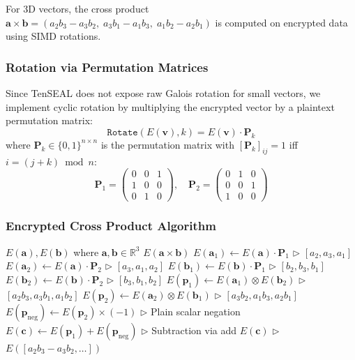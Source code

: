 \documentclass[conference,12pt]{IEEEtran}
\begin{document}
For 3D vectors, the cross product $\mathbf{a} \times \mathbf{b} = (a_2 b_3 - a_3 b_2, \; a_3 b_1 - a_1 b_3, \; a_1 b_2 - a_2 b_1)$ is computed on encrypted data using SIMD rotations.

\subsubsection{Rotation via Permutation Matrices}
Since TenSEAL does not expose raw Galois rotation for small vectors, we implement cyclic rotation by multiplying the encrypted vector by a plaintext permutation matrix:
\begin{equation}
    \texttt{Rotate}(E(\mathbf{v}), k) = E(\mathbf{v}) \cdot \mathbf{P}_k
\end{equation}
where $\mathbf{P}_k \in \{0,1\}^{n \times n}$ is the permutation matrix with $[\mathbf{P}_k]_{ij} = 1$ iff $i = (j+k) \bmod n$:
\begin{equation}
    \mathbf{P}_1 = \begin{pmatrix} 0 & 0 & 1 \\ 1 & 0 & 0 \\ 0 & 1 & 0 \end{pmatrix}, \quad
    \mathbf{P}_2 = \begin{pmatrix} 0 & 1 & 0 \\ 0 & 0 & 1 \\ 1 & 0 & 0 \end{pmatrix}
\end{equation}

\subsubsection{Encrypted Cross Product Algorithm}

\begin{algorithm}[htbp]
\caption{Encrypted Cross Product}
\label{alg:cross_product}
\begin{algorithmic}[1]
\REQUIRE $E(\mathbf{a}), E(\mathbf{b})$ where $\mathbf{a}, \mathbf{b} \in \mathbb{R}^3$
\ENSURE $E(\mathbf{a} \times \mathbf{b})$
\STATE $E(\mathbf{a}_1) \leftarrow E(\mathbf{a}) \cdot \mathbf{P}_1$ \hfill $\triangleright$ $[a_2, a_3, a_1]$
\STATE $E(\mathbf{a}_2) \leftarrow E(\mathbf{a}) \cdot \mathbf{P}_2$ \hfill $\triangleright$ $[a_3, a_1, a_2]$
\STATE $E(\mathbf{b}_1) \leftarrow E(\mathbf{b}) \cdot \mathbf{P}_1$ \hfill $\triangleright$ $[b_2, b_3, b_1]$
\STATE $E(\mathbf{b}_2) \leftarrow E(\mathbf{b}) \cdot \mathbf{P}_2$ \hfill $\triangleright$ $[b_3, b_1, b_2]$
\STATE $E(\mathbf{p}_1) \leftarrow E(\mathbf{a}_1) \otimes E(\mathbf{b}_2)$ \hfill $\triangleright$ $[a_2 b_3, a_3 b_1, a_1 b_2]$
\STATE $E(\mathbf{p}_2) \leftarrow E(\mathbf{a}_2) \otimes E(\mathbf{b}_1)$ \hfill $\triangleright$ $[a_3 b_2, a_1 b_3, a_2 b_1]$
\STATE $E(\mathbf{p}_{\text{neg}}) \leftarrow E(\mathbf{p}_2) \times (-1)$ \hfill $\triangleright$ Plain scalar negation
\STATE $E(\mathbf{c}) \leftarrow E(\mathbf{p}_1) + E(\mathbf{p}_{\text{neg}})$ \hfill $\triangleright$ Subtraction via add
\RETURN $E(\mathbf{c})$ \hfill $\triangleright$ $E([a_2b_3-a_3b_2, \ldots])$
\end{algorithmic}
\end{algorithm}
\end{document}
